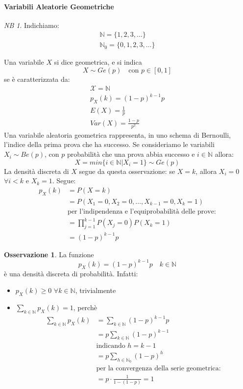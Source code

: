 \documentclass{article}
\theoremstyle{plain}
\theoremstyle{definition}
\newtheorem{osservazione}{Osservazione}[section]
\theoremstyle{remark}
\newtheorem*{NB}{NB}
\begin{document}
\paragraph{Variabili Aleatorie Geometriche} %
\label{par:variabili_aleatorie_geometriche}
\begin{NB}
	Indichiamo:
	\begin{align*}
		\mathds{N}=\{1,2,3,\dots\}\\
		\mathds{N}_0=\{0,1,2,3,\dots\}
	\end{align*}
\end{NB}
Una variabile $X$ si dice geometrica, e si indica
\begin{equation*}
	X\sim Ge(p)\quad\text{con }p\in[0,1]
\end{equation*}
se è caratterizzata da:
\begin{align*}
	\mathcal{X}=\mathds{N}\\
	p_X(k)=(1-p)^{k-1}p\\
	E(X)=\frac{1}{p}\\
	Var(X)=\frac{1-p}{p^2}
\end{align*}
Una variabile aleatoria geometrica rappresenta, in uno schema di Bernoulli, l'indice della prima prova che ha successo. Se consideriamo le variabili $X_i\sim Be(p)$, con $p$ probabilità che una prova abbia successo e $i\in\mathds{N}$ allora:
\begin{equation*}
	X=min\{i\in\mathds{N}|X_i=1\}\sim Ge(p)
\end{equation*}
La densità discreta di $X$ segue da questa osservazione: se $X=k$, allora $X_i=0$ $\forall i<k$ e $X_k=1$. Segue:
\begin{align*}
	p_X(k)&=P(X=k)\\
	&=P(X_1=0, X_2=0,\dots, X_{k-1}=0, X_k=1)\\
	&\text{per l'indipendenza e l'equiprobabilità delle prove:}\\
	&=\prod_{j=1}^{k-1} P(X_j=0)P(X_k=1)\\
	&=(1-p)^{k-1}p
\end{align*}
\begin{osservazione}
	La funzione
	\begin{equation*}
		p_X(k)=(1-p)^{k-1}p\quad k\in\mathds{N}
	\end{equation*}
	è una densità discreta di probabilità. Infatti:
	\begin{itemize}
		\item $p_X(k)\geq0$ $\forall k\in\mathds{N}$, trivialmente
		\item $\sum_{k\in\mathds{N}}p_X(k)=1$, perchè
		\begin{align*}
			\sum_{k\in\mathds{N}}p_X(k)&=\sum_{k\in\mathds{N}}(1-p)^{k-1}p\\
			&=p\sum_{k\in\mathds{N}}(1-p)^{k-1}\\
			&\text{indicando }h=k-1\\
			&=p\sum_{h\in\mathds{N}_0}(1-p)^h\\
			&\text{per la convergenza della serie geometrica:}\\
			&=p\cdot\frac{1}{1-(1-p)}=1
		\end{align*}
	\end{itemize}
\end{osservazione}
\end{document}
